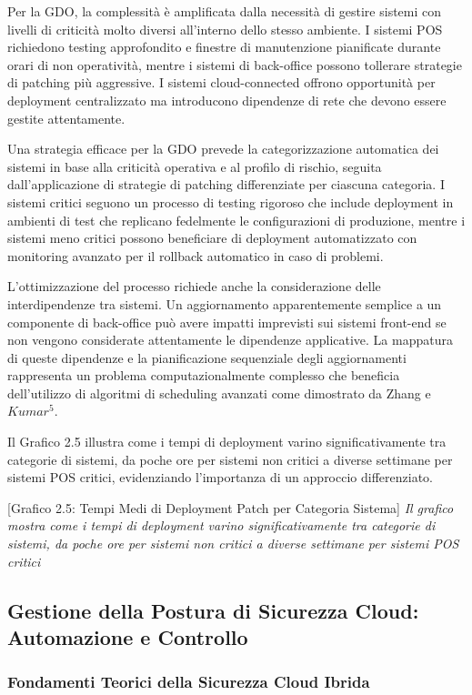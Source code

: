 {Per la GDO, la complessità è amplificata dalla necessità di gestire sistemi con livelli di criticità molto diversi all'interno dello stesso ambiente. I sistemi POS richiedono testing approfondito e finestre di manutenzione pianificate durante orari di non operatività, mentre i sistemi di back-office possono tollerare strategie di patching più aggressive. I sistemi cloud-connected offrono opportunità per deployment centralizzato ma introducono dipendenze di rete che devono essere gestite attentamente.

Una strategia efficace per la GDO prevede la categorizzazione automatica dei sistemi in base alla criticità operativa e al profilo di rischio, seguita dall'applicazione di strategie di patching differenziate per ciascuna categoria. I sistemi critici seguono un processo di testing rigoroso che include deployment in ambienti di test che replicano fedelmente le configurazioni di produzione, mentre i sistemi meno critici possono beneficiare di deployment automatizzato con monitoring avanzato per il rollback automatico in caso di problemi.

L'ottimizzazione del processo richiede anche la considerazione delle interdipendenze tra sistemi. Un aggiornamento apparentemente semplice a un componente di back-office può avere impatti imprevisti sui sistemi front-end se non vengono considerate attentamente le dipendenze applicative. La mappatura di queste dipendenze e la pianificazione sequenziale degli aggiornamenti rappresenta un problema computazionalmente complesso che beneficia dell'utilizzo di algoritmi di scheduling avanzati come dimostrato da Zhang e $Kumar$$^{5}$.

Il Grafico 2.5 illustra come i tempi di deployment varino significativamente tra categorie di sistemi, da poche ore per sistemi non critici a diverse settimane per sistemi POS critici, evidenziando l'importanza di un approccio differenziato.

[Grafico 2.5: Tempi Medi di Deployment Patch per Categoria Sistema]
\textit{Il grafico mostra come i tempi di deployment varino significativamente tra categorie di sistemi, da poche ore per sistemi non critici a diverse settimane per sistemi POS critici}

\subsection{Gestione della Postura di Sicurezza Cloud: Automazione e Controllo}

\subsubsection{Fondamenti Teorici della Sicurezza Cloud Ibrida}

}
